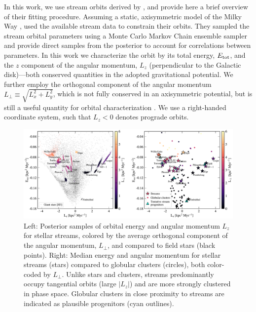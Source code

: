 \documentclass[twocolumn]{aastex63}
\begin{document}

In this work, we use stream orbits derived by \citet{bk2021}, and provide here a brief overview of their fitting procedure.
Assuming a static, axisymmetric model of the Milky Way \citep[v1.2 \texttt{MilkyWayPotential}]{gala}, \citet{bk2021} used the available stream data to constrain their orbits.
They sampled the stream orbital parameters using a Monte Carlo Markov Chain ensemble sampler and provide direct samples from the posterior to account for correlations between parameters.
In this work we characterize the orbit by its total energy, $E_{\rm tot}$, and the $z$ component of the angular momentum, $L_z$ (perpendicular to the Galactic disk)---both conserved quantities in the adopted gravitational potential.
We further employ the orthogonal component of the angular momentum $L_\perp \equiv \sqrt{L_x^2 + L_y^2}$, which is not fully conserved in an axisymmetric potential, but is still a useful quantity for orbital characterization \citep[e.g.,][]{helmi1999}.
We use a right-handed coordinate system, such that $L_z<0$ denotes prograde orbits.

\begin{figure}
\begin{center}
\includegraphics[width=\textwidth]{elz_streams.pdf}
\end{center}
\caption{
Left: Posterior samples of orbital energy and angular momentum $L_z$ for stellar streams, colored by the average orthogonal component of the angular momentum, $L_\perp$, and compared to field stars (black points).
Right: Median energy and angular momentum for stellar streams (stars) compared to globular clusters (circles), both color-coded by $L_\perp$.
Unlike stars and clusters, streams predominantly occupy tangential orbits (large $|L_z|$) and are more strongly clustered in phase space.
Globular clusters in close proximity to streams are indicated as plausible progenitors (cyan outlines).
}
\label{fig:elz}
\end{figure}
\end{document}
